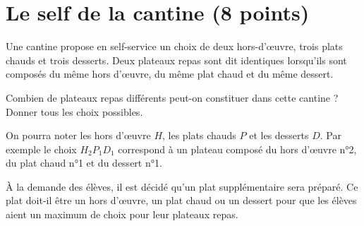 \section{Le self de la cantine (8 points)}

Une cantine propose en self-service un choix de deux hors-d'\oe uvre, trois plats chauds et trois desserts. Deux plateaux repas sont dit identiques lorsqu'ils sont composés du même hors d'\oe uvre, du même plat chaud et du même dessert.

\begin{questions}
	\question[4] Combien de plateaux repas différents peut-on constituer dans cette cantine ? Donner tous les choix possibles. 
	
	
	On pourra noter les hors d'\oe uvre $H$, les plats chauds $P$ et les desserts $D$. Par exemple le choix $H_2P_1D_1$ correspond à un plateau composé du hors d'\oe uvre n°2, du plat chaud n°1 et du dessert n°1. 
	
	\question 
	
	\question[1] \`A la demande des élèves, il est décidé qu'un plat supplémentaire sera préparé. Ce plat doit-il être un hors d'\oe uvre, un plat chaud ou un dessert pour que les élèves aient un maximum de choix pour leur plateaux repas. 
\end{questions}